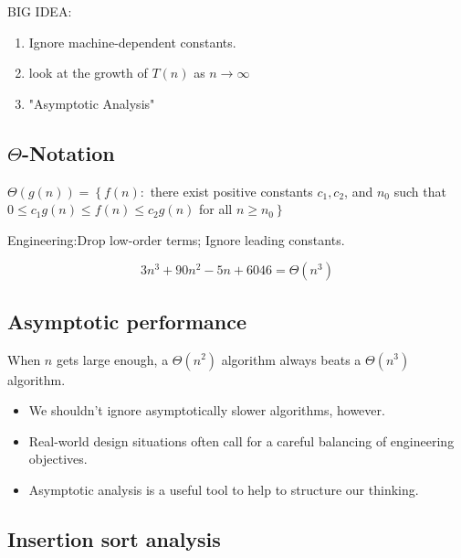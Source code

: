 \documentclass[11pt]{elegantbook}
\begin{document}
\begin{note}
  BIG IDEA:
\end{note}
\begin{enumerate}
  \item Ignore machine-dependent constants.
  \item look at the growth of $T(n)$ as $n\to \infty$
  \item "Asymptotic Analysis"
\end{enumerate}
\subsection{$\Theta$-Notation}
\begin{definition}
  $\Theta(g(n))=\left\{f(n):\right.$ there exist positive constants $c_{1}, c_{2}$, and $n_{0}$ such that $0 \leq c_{1} g(n) \leq f(n) \leq c_{2} g(n)$ for all $\left.n \geq n_{0}\right\}$
\end{definition}
\begin{note}
  Engineering:Drop low-order terms; Ignore leading constants.
\end{note}
\begin{example}
  $$
3 n^{3}+90 n^{2}-5 n+6046=\Theta\left(n^{3}\right)
$$
\end{example}
\subsection{Asymptotic performance}
\begin{note}
  When $n$ gets large enough, a $\Theta\left(n^{2}\right)$ algorithm always beats a $\Theta\left(n^{3}\right)$ algorithm.
\end{note}


\begin{note}
  \begin{itemize}
    \item We shouldn't ignore asymptotically slower algorithms, however.
    \item Real-world design situations often call for a careful balancing of engineering objectives. 
    \item Asymptotic analysis is a useful tool to help to structure our thinking.
  \end{itemize}
\end{note}
\subsection{Insertion sort analysis}
\end{document}
